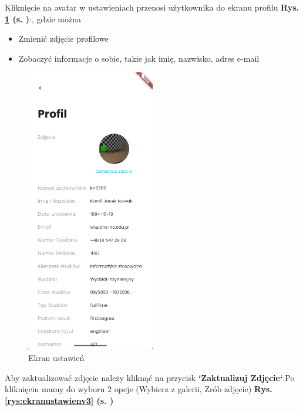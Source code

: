 Kliknięcie na avatar w ustawieniach przenosi użytkownika do ekranu profilu \textbf{Rys. \ref{rys:ekranustawien2} (s. \pageref{rys:ekranustawien2})}:, gdzie można
\begin{itemize}
	\item Zmienić zdjęcie profilowe
	\item Zobaczyć informacje o sobie, takie jak imię, nazwisko, adres e-mail
\end{itemize}
\begin{figure}[h!]
	\centering
	\includegraphics[width=0.5\textwidth]{rys/ekranustawienv2.png}
	\caption{Ekran ustawień}
	\label{rys:ekranustawien2}
\end{figure}
\newpage
Aby zaktualizować zdjęcie należy kliknąć na przycisk \textbf{`Zaktualizuj Zdjęcie`}.Po kliknięciu mamy do wyboru 2 opcje (Wybierz z galerii, Zrób zdjęcie) \textbf{Rys. \ref{rys:ekranustawienv3} (s. \pageref{rys:ekranustawienv3})}
